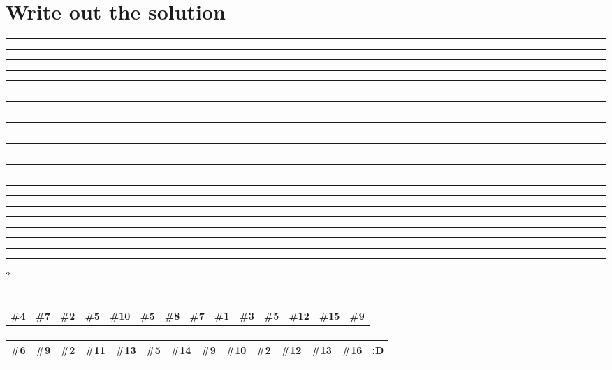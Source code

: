 \documentclass[12pt]{article}
\begin{document}
\section*{Write out the solution}
\noindent 
\rule{0.5cm}{0.4pt} \rule{0.5cm}{0.4pt} \rule{0.5cm}{0.4pt} 
\quad 
\rule{0.5cm}{0.4pt} 
\quad 
\rule{0.5cm}{0.4pt} \rule{0.5cm}{0.4pt} \rule{0.5cm}{0.4pt} \rule{0.5cm}{0.4pt} 
\quad
\rule{0.5cm}{0.4pt} \rule{0.5cm}{0.4pt} \rule{0.5cm}{0.4pt}
\quad 
\rule{0.5cm}{0.4pt} \rule{0.5cm}{0.4pt} \rule{0.5cm}{0.4pt} \rule{0.5cm}{0.4pt} \rule{0.5cm}{0.4pt} 
\quad 
\rule{0.5cm}{0.4pt} \rule{0.5cm}{0.4pt} \rule{0.5cm}{0.4pt} \rule{0.5cm}{0.4pt} \rule{0.5cm}{0.4pt} \rule{0.5cm}{0.4pt} 
\quad ?
\\\\
\noindent %
\begin{tabular}{|*{14}{W|}} 
\hline
\textbf{\#4} & \textbf{\#7} & \textbf{\#2} & \textbf{\#5} & \textbf{\#10} & \textbf{\#5} & \textbf{\#8} & \textbf{\#7} & \textbf{\#1} & \textbf{\#3} & \textbf{\#5} & \textbf{\#12} & \textbf{\#15} & \textbf{\#9} \\

\hline
& & & & & & & & & & & & & \\
\hline
\end{tabular}

\vspace{1em} %

\noindent
\begin{tabular}{|*{14}{W|}} 
\hline
\textbf{\#6} & \textbf{\#9} & \textbf{\#2} & \textbf{\#11} & \textbf{\#13} & \textbf{\#5} & \textbf{\#14} & \textbf{\#9} & \textbf{\#10} & \textbf{\#2} & \textbf{\#12} & \textbf{\#13} & \textbf{\#16} & \textbf{:D} \\
\hline
& & & & & & & & & & & & & \\
\hline
\end{tabular}
\end{document}
